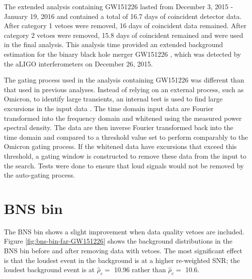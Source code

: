 The extended analysis containing GW151226 lasted from December 3, 2015 - January 19, 2016 and
contained a total of 16.7 days of coincident detector data.
After category 1 vetoes were removed, 16 days of coincident data remained. After
category 2 vetoes were removed, 15.8 days of coincident remained and were used in the
final analysis.
This analysis time provided
an extended background estimation for the binary black hole merger GW151226 \cite{GW151226},
which was detected by the aLIGO interferometers on December 26, 2015.

The gating process used in the analysis containing GW151226 was different than that used in 
previous analyses. 
Instead of relying on an external process, such as Omicron, to identify large transients,
an internal test is used to find large excursions in the input data \cite{Usman:2015kfa}.
The time domain input
data are Fourier transformed into the frequency domain and whitened using the
measured power spectral density. The data are then inverse Fourier transformed back into
the time domain and compared to a threshold value set to perform comparably to the
Omicron gating process.
If the whitened data have excursions that exceed this threshold, a gating window is
constructed to remove these data from the input to the search.
Tests were done to ensure that loud signals would not be removed by the auto-gating process.

\section{BNS bin}

The BNS bin shows a slight improvement when data quality vetoes are included.
Figure \ref{fig:bns-bin-far-GW151226} shows the background distributions in the BNS
bin before and after removing data with vetoes. The most significant
effect is that the loudest event in the background is at a higher re-weighted SNR;
the loudest background event is at $\hat{\rho}_{c} =$ 10.96 rather
than $\hat{\rho}_{c} =$ 10.6.

